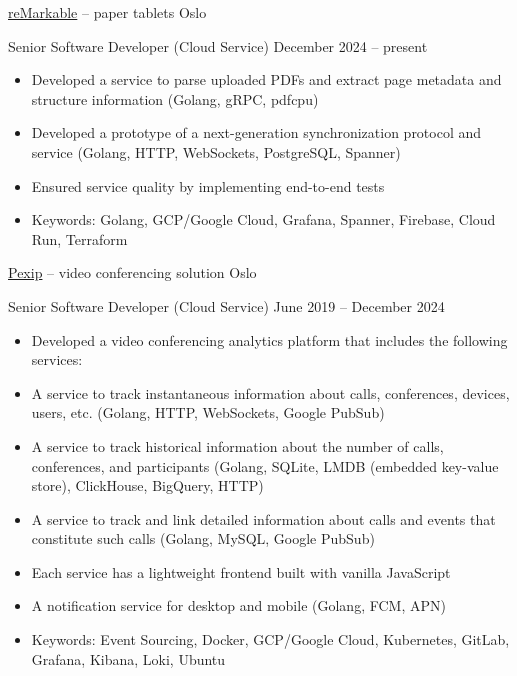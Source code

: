 \documentclass[unicode, 10pt, a4paper, oneside, fleqn]{article}
\begin{document}
\job  %
    {\href{https://remarkable.com}{reMarkable} -- paper tablets}
    {Oslo}
    {
        \position  %
        {Senior Software Developer (Cloud Service)}
        {December 2024 -- present}
        {
            \begin{itemize}
                \item{Developed a service to parse uploaded PDFs and extract
                    page metadata and structure information (Golang, gRPC, pdfcpu)}
                \item{Developed a prototype of a next-generation
                    synchronization protocol and service (Golang, HTTP,
                    WebSockets, PostgreSQL, Spanner)}
                \item{Ensured service quality by implementing end-to-end tests}
                \item{Keywords: Golang, GCP/Google Cloud, Grafana, Spanner, Firebase, Cloud Run, Terraform}
            \end{itemize}
        }
    }


\job  %
    {\href{http://www.pexip.com}{Pexip} -- video conferencing solution}
    {Oslo}
    {
        \position  %
        {Senior Software Developer (Cloud Service)}
        {June 2019 -- December 2024}
        {
            \begin{itemize}
                \item{Developed a video conferencing analytics platform that
                    includes the following services:}
                \item{A service to track instantaneous information about calls,
                    conferences, devices, users, etc. (Golang, HTTP, WebSockets,
                Google PubSub)}
                \item{A service to track historical information about the number
                    of calls, conferences, and participants (Golang, SQLite,
                LMDB (embedded key-value store), ClickHouse, BigQuery, HTTP)}
                \item{A service to track and link detailed information about
                    calls and events that constitute such calls (Golang, MySQL,
                Google PubSub)}
                \item{Each service has a lightweight frontend built with vanilla JavaScript}
                \item{A notification service for desktop and mobile (Golang,
                    FCM, APN)}
                \item{Keywords: Event Sourcing, Docker, GCP/Google Cloud,
                    Kubernetes, GitLab, Grafana, Kibana, Loki, Ubuntu}
            \end{itemize}
        }
    }
\end{document}

